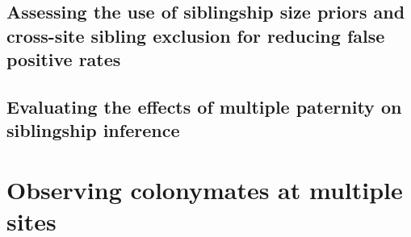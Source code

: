 \documentclass[12pt]{article}
\begin{document}
\subsection{Assessing the use of siblingship size priors and cross-site sibling exclusion for reducing false positive rates}

\subsection{Evaluating the effects of multiple paternity on siblingship inference}




\section{Observing colonymates at multiple sites}
\end{document}
